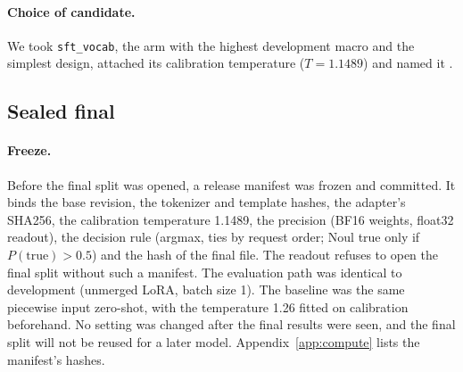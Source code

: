 \paragraph{Choice of candidate.}
We took \texttt{sft\_vocab}, the arm with the highest development macro and the simplest
design, attached its calibration temperature ($T=1.1489$) and named it \expone.

\subsection{Sealed final}
\label{sec:final}

\paragraph{Freeze.}
Before the final split was opened, a release manifest was frozen and committed. It binds the
base revision, the tokenizer and template hashes, the adapter's SHA256, the calibration
temperature 1.1489, the precision (BF16 weights, float32 readout), the decision rule (argmax,
ties by request order; Noul true only if $P(\text{true})>0.5$) and the hash of the final
file. The readout refuses to open the final split without such a manifest. The evaluation
path was identical to development (unmerged LoRA, batch size 1). The baseline was the same
piecewise input zero-shot, with the temperature 1.26 fitted on calibration beforehand. No
setting was changed after the final results were seen, and the final split will not be
reused for a later model. Appendix~\ref{app:compute} lists the manifest's hashes.

